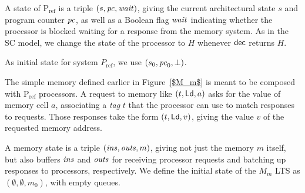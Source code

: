 A state of P$_{\text{ref}}$ is a triple $(s, \mathit{pc}, \mathit{wait})$, giving the current architectural
state $s$ and program counter $\mathit{pc}$, as well as a Boolean flag $\mathit{wait}$
indicating whether the processor is blocked waiting for a response from the
memory system. As in the SC model, we change the state of the processor to $H$
whenever $\mathsf{dec}$ returns $H$. 

As initial state for system $P_\text{ref}$, we use $(s_0, \mathit{pc}_0, \bot)$.


The simple memory defined earlier in Figure~\ref{$M_m$} is meant to be composed with P$_{\text{ref}}$
processors.  %
A request to memory like $(t, \mathsf{Ld}, a)$ asks
for the value of memory cell $a$, associating a \emph{tag} $t$ that the
processor can use to match responses to requests.  Those responses take the
form $(t, \mathsf{Ld}, v)$, giving the value $v$ of the requested memory address.

A memory state is a triple $(\mathit{ins}, \mathit{outs}, m)$, giving not just the
memory $m$ itself, but also buffers $\mathit{ins}$ and $\mathit{outs}$ for receiving
processor requests and batching up responses to processors,
respectively.  We define the initial state of the $M_m$ LTS as
$(\emptyset, \emptyset, m_0)$, with empty queues.


